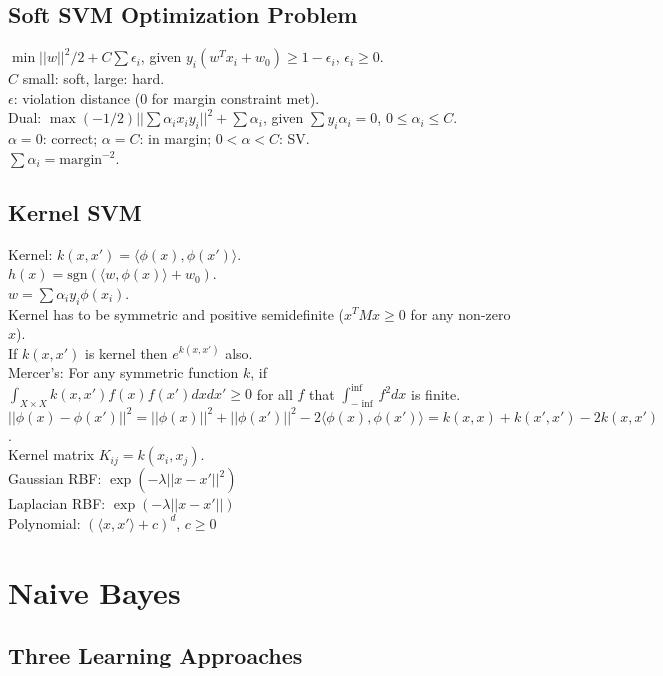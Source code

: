 \subsection*{Soft SVM Optimization Problem}

$\min ||w||^2/2 + C \sum \epsilon_i$, given $y_i(w^T x_i + w_0) \geq 1 - \epsilon_i$, $\epsilon_i \geq 0$.\\
$C$ small: soft, large: hard.\\
$\epsilon$: violation distance (0 for margin constraint met).\\
Dual: $\max (-1/2) ||\sum \alpha_i x_i y_i||^2 + \sum \alpha_i$, given $\sum y_i \alpha_i = 0$, $0 \leq \alpha_i \leq C$.\\
$\alpha=0$: correct; $\alpha=C$: in margin; $0 < \alpha < C$: SV.\\
$\sum \alpha_i = \text{margin}^{-2}$.

\subsection*{Kernel SVM}

Kernel: $k(x, x') = \langle \phi(x), \phi(x') \rangle$.\\
$h(x) = \text{sgn}(\langle w, \phi(x) \rangle + w_0)$.\\
$w = \sum\alpha_i y_i \phi(x_i)$.\\
Kernel has to be symmetric and positive semidefinite ($x^TMx \geq 0$ for any non-zero $x$).\\
If $k(x, x')$ is kernel then $e^{k(x, x')}$ also.\\
Mercer's: For any symmetric function $k$, if $\int_{X \times X}k(x, x')f(x)f(x')dxdx' \geq 0$ for all $f$ that $\int_{-\inf}^{\inf}f^2dx$ is finite.\\
$||\phi(x) - \phi(x')||^2 = ||\phi(x)||^2+||\phi(x')||^2-2\langle \phi(x), \phi(x')\rangle = k(x, x) + k(x', x') - 2k(x, x')$.\\
Kernel matrix $K_{ij} = k(x_i, x_j)$.\\
Gaussian RBF: $\exp(-\lambda ||x - x'||^2)$\\
Laplacian RBF: $\exp(-\lambda ||x - x'||)$\\
Polynomial: $(\langle x, x' \rangle + c)^d$, $c \geq 0$

\section{Naive Bayes}

\subsection*{Three Learning Approaches}

